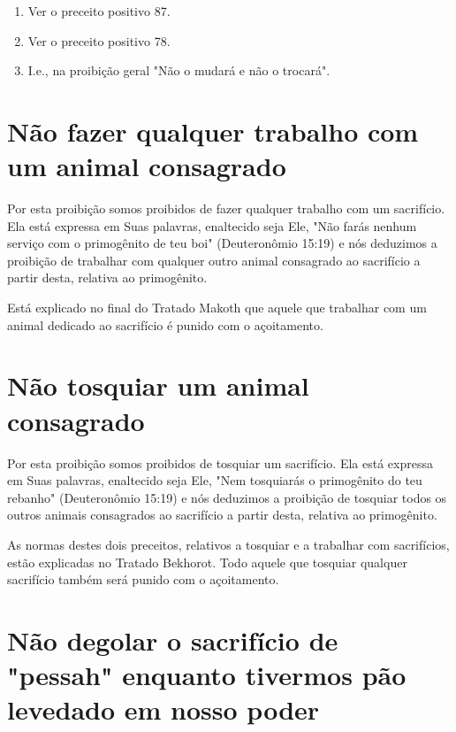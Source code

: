 \begin{itemize}
\begin{enumrate}
\begin{itemize}
\begin{itemize}
\begin{itemize}
\begin{enumerate}
\def\labelenumi{\arabic{enumi}.}
\setcounter{enumi}{277}
\item
 
 Ver o preceito positivo 87.
 
\item
 
 Ver o preceito positivo 78.
 
\item
 
 I.e., na proibição geral "Não o mudará e não o trocará".
 
\end{enumerate}



\section{Não fazer qualquer trabalho com um animal consagrado}

Por esta proibição somos proibidos de fazer qualquer trabalho com um
sacrifício. Ela está expressa em Suas palavras, enaltecido seja Ele,
"Não fa­rás nenhum serviço com o primogênito de teu boi" (Deuteronômio
15:19) e nós deduzimos a proibição de trabalhar com qualquer outro
animal consagra­do ao sacrifício a partir desta, relativa ao
primogênito.

Está explicado no final do Tratado Makoth que aquele que trabalhar com
um animal dedicado ao sacrifício é punido com o açoitamento.

\section{Não tosquiar um animal consagrado}

Por esta proibição somos proibidos de tosquiar um sacrifício. Ela es­tá
expressa em Suas palavras, enaltecido seja Ele, "Nem tosquiarás o
primogê­nito do teu rebanho" (Deuteronômio 15:19) e nós deduzimos a
proibição de tosquiar todos os outros animais consagrados ao sacrifício
a partir desta, relati­va ao primogênito.

As normas destes dois preceitos, relativos a tosquiar e a trabalhar com
sacrifícios, estão explicadas no Tratado Bekhorot. Todo aquele que
tosquiar qualquer sacrifício também será punido com o açoitamento.

\section{Não degolar o sacrifício de "pessah" enquanto tivermos pão levedado em nosso poder}


\end{itemize}
\end{itemize}
\end{itemize}
\end{enumrate}
\end{itemize}
